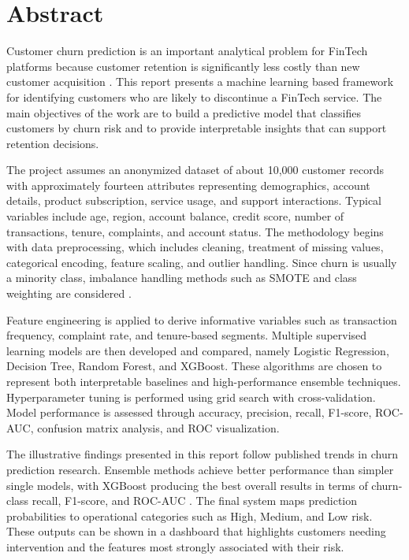 \clearpage
{}
{}
\chapter*{Abstract}

Customer churn prediction is an important analytical problem for FinTech platforms because customer retention is significantly less costly than new customer acquisition \cite{systematicreview,bhattacharjee2026}. This report presents a machine learning based framework for identifying customers who are likely to discontinue a FinTech service. The main objectives of the work are to build a predictive model that classifies customers by churn risk and to provide interpretable insights that can support retention decisions.

The project assumes an anonymized dataset of about 10{,}000 customer records with approximately fourteen attributes representing demographics, account details, product subscription, service usage, and support interactions. Typical variables include age, region, account balance, credit score, number of transactions, tenure, complaints, and account status. The methodology begins with data preprocessing, which includes cleaning, treatment of missing values, categorical encoding, feature scaling, and outlier handling. Since churn is usually a minority class, imbalance handling methods such as SMOTE and class weighting are considered \cite{imani2024}.

Feature engineering is applied to derive informative variables such as transaction frequency, complaint rate, and tenure-based segments. Multiple supervised learning models are then developed and compared, namely Logistic Regression, Decision Tree, Random Forest, and XGBoost. These algorithms are chosen to represent both interpretable baselines and high-performance ensemble techniques. Hyperparameter tuning is performed using grid search with cross-validation. Model performance is assessed through accuracy, precision, recall, F1-score, ROC-AUC, confusion matrix analysis, and ROC visualization.

The illustrative findings presented in this report follow published trends in churn prediction research. Ensemble methods achieve better performance than simpler single models, with XGBoost producing the best overall results in terms of churn-class recall, F1-score, and ROC-AUC \cite{imani2024,bhattacharjee2026}. The final system maps prediction probabilities to operational categories such as High, Medium, and Low risk. These outputs can be shown in a dashboard that highlights customers needing intervention and the features most strongly associated with their risk.


